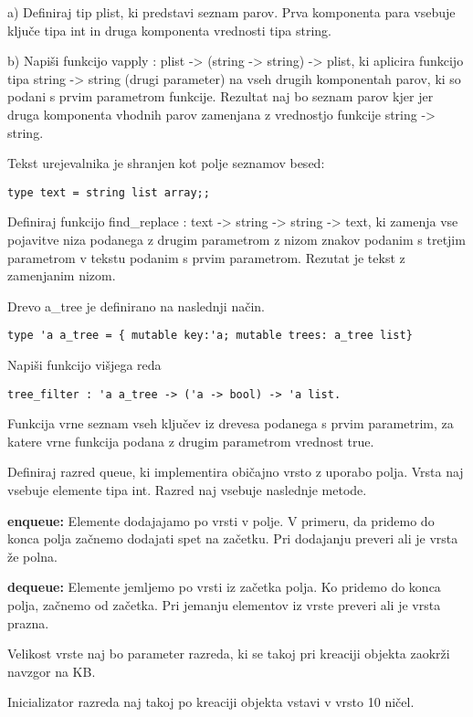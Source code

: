 \begin{ex}
\end{ex} \begin{ex}
a) Definiraj tip plist, ki predstavi seznam parov. Prva komponenta para vsebuje klju\v ce tipa int in druga komponenta vrednosti tipa string. 

b) Napi\v si funkcijo vapply : plist -> (string -> string) -> plist, ki aplicira funkcijo tipa string -> string (drugi parameter) na vseh drugih komponentah parov, ki so podani s prvim parametrom funkcije. Rezultat naj bo seznam parov kjer jer druga komponenta vhodnih parov zamenjana z vrednostjo funkcije string -> string. 


\end{ex} \begin{ex}
Tekst urejevalnika je shranjen kot polje seznamov besed:
\begin{verbatim}
type text = string list array;;
\end{verbatim}
  
Definiraj funkcijo find\_replace : text -> string -> string -> text, ki zamenja vse pojavitve niza podanega z drugim parametrom z nizom znakov podanim s tretjim parametrom v tekstu podanim s prvim parametrom. Rezutat je tekst z zamenjanim nizom. 


\end{ex} 
\begin{ex}
Drevo a\_tree je definirano na naslednji na\v cin.
\begin{verbatim}
type 'a a_tree = { mutable key:'a; mutable trees: a_tree list}
\end{verbatim}

Napi\v si funkcijo vi\v sjega reda 

\begin{verbatim}
tree_filter : 'a a_tree -> ('a -> bool) -> 'a list.
\end{verbatim}

Funkcija vrne seznam vseh klju\v cev iz drevesa podanega s prvim parametrim, za katere vrne funkcija podana z drugim parametrom vrednost true.   

\end{ex} 
\begin{ex}
Definiraj razred queue, ki implementira obi\v cajno vrsto z uporabo polja. Vrsta naj vsebuje elemente tipa int. Razred naj vsebuje naslednje metode.

\textbf{enqueue:} Elemente dodajajamo po vrsti v polje. V primeru, da pridemo do konca polja za\v cnemo dodajati spet na za\v cetku. Pri dodajanju preveri ali je vrsta \v ze polna.
                 
\textbf{dequeue:} Elemente jemljemo po vrsti iz za\v cetka polja. Ko pridemo do konca polja,  za\v cnemo od za\v cetka. Pri jemanju elementov iz vrste preveri ali je vrsta 
  prazna.

Velikost vrste naj bo parameter razreda, ki se takoj pri kreaciji objekta zaokr\v zi navzgor na KB.

Inicializator razreda naj takoj po kreaciji objekta vstavi v vrsto 10 ni\v cel.


\end{ex}
